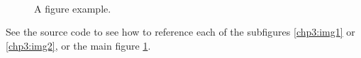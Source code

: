 \documentclass[defaultstyle,10pt,master,Helvetica]{thesis}
\begin{document}
\begin{figure}[t]
\centering
{}
\hspace*{0.5cm}
\\
\caption{A figure example.}
\label{fig:rmain figure}
\end{figure}

See the source code to see how to reference each of the subfigures \ref{chp3:img1} or \ref{chp3:img2}, or the main figure \ref{fig:rmain figure}.
\end{document}
